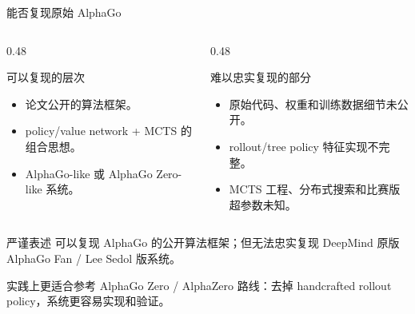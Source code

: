 \documentclass[UTF8,aspectratio=169,10pt]{ctexbeamer}
\begin{document}
\begin{frame}{能否复现原始 AlphaGo}
  \begin{columns}[T,onlytextwidth]
    \begin{column}{0.48\textwidth}
      \begin{block}{可以复现的层次}
        \begin{itemize}
          \item 论文公开的算法框架。
          \item policy/value network + MCTS 的组合思想。
          \item AlphaGo-like 或 AlphaGo Zero-like 系统。
        \end{itemize}
      \end{block}
    \end{column}
    \begin{column}{0.48\textwidth}
      \begin{alertblock}{难以忠实复现的部分}
        \begin{itemize}
          \item 原始代码、权重和训练数据细节未公开。
          \item rollout/tree policy 特征实现不完整。
          \item MCTS 工程、分布式搜索和比赛版超参数未知。
        \end{itemize}
      \end{alertblock}
    \end{column}
  \end{columns}

  \vspace{0.18cm}
  \begin{block}{严谨表述}
    可以复现 AlphaGo 的公开算法框架；但无法忠实复现 DeepMind 原版 AlphaGo Fan / Lee Sedol 版系统。
  \end{block}

  \vspace{0.05cm}
  \begin{center}
    \small
    实践上更适合参考 AlphaGo Zero / AlphaZero 路线：去掉 handcrafted rollout policy，系统更容易实现和验证。
  \end{center}
\end{frame}
\end{document}
